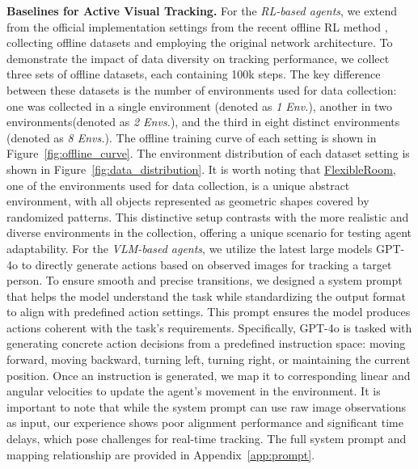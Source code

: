 \documentclass{article}
\begin{document}
 
\textbf{Baselines for Active Visual Tracking.}
For the \emph{RL-based agents}, we extend from the official implementation settings from the recent offline RL method \citep{zhong2024empowering}, collecting offline datasets and employing the original network architecture. 
To demonstrate the impact of data diversity on tracking performance, we collect three sets of offline datasets, each containing 100k steps. The key difference between these datasets is the number of environments used for data collection: one was collected in a single environment (denoted as \textit{1 Env.}), another in two environments(denoted as \textit{2 Envs.}), and the third in eight distinct environments (denoted as \textit{8 Envs.}). The offline training curve of each setting is shown in Figure~\ref{fig:offline_curve}. The environment distribution of each dataset setting is shown in Figure~\ref{fig:data_distribution}. It is worth noting that \underline{FlexibleRoom}, one of the environments used for data collection, is a unique abstract environment, with all objects represented as geometric shapes covered by randomized patterns. This distinctive setup contrasts with the more realistic and diverse environments in the collection, offering a unique scenario for testing agent adaptability. 
For the \emph{VLM-based agents}, we utilize the latest large models GPT-4o to directly generate actions based on observed images for tracking a target person. To ensure smooth and precise transitions, we designed a system prompt that helps the model understand the task while standardizing the output format to align with predefined action settings. This prompt ensures the model produces actions coherent with the task's requirements. Specifically, GPT-4o is tasked with generating concrete action decisions from a predefined instruction space: moving forward, moving backward, turning left, turning right, or maintaining the current position. Once an instruction is generated, we map it to corresponding linear and angular velocities to update the agent's movement in the environment. It is important to note that while the system prompt can use raw image observations as input, our experience shows poor alignment performance and significant time delays, which pose challenges for real-time tracking. The full system prompt and mapping relationship are provided in Appendix~\ref{app:prompt}.
\end{document}
